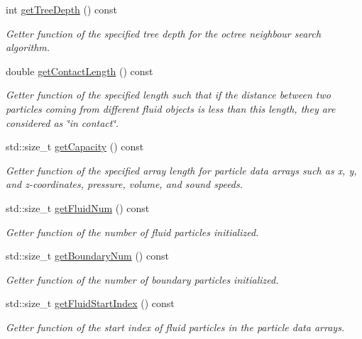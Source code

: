 \begin{DoxyCompactItemize}
int \hyperlink{classInitializer_ada300941810ded357d47b0f60c78eff9}{get\-Tree\-Depth} () const 
\begin{DoxyCompactList}\small\item\em Getter function of the specified tree depth for the octree neighbour search algorithm. \end{DoxyCompactList}\item 
double \hyperlink{classInitializer_a2ab802f1e315b413d2f9a7cf409e8330}{get\-Contact\-Length} () const 
\begin{DoxyCompactList}\small\item\em Getter function of the specified length such that if the distance between two particles coming from different fluid objects is less than this length, they are considered as \char`\"{}in contact\char`\"{}. \end{DoxyCompactList}\item 
std\-::size\-\_\-t \hyperlink{classInitializer_ab6879dbbdc2362c8d274a5b25ec2bb28}{get\-Capacity} () const 
\begin{DoxyCompactList}\small\item\em Getter function of the specified array length for particle data arrays such as x, y, and z-\/coordinates, pressure, volume, and sound speeds. \end{DoxyCompactList}\item 
std\-::size\-\_\-t \hyperlink{classInitializer_a5b13b014185a5a2b7cf8c0f8b23e07c0}{get\-Fluid\-Num} () const 
\begin{DoxyCompactList}\small\item\em Getter function of the number of {\itshape fluid} particles initialized. \end{DoxyCompactList}\item 
std\-::size\-\_\-t \hyperlink{classInitializer_a68bbcc759e78e4774d32b1cd3a71ef82}{get\-Boundary\-Num} () const 
\begin{DoxyCompactList}\small\item\em Getter function of the number of {\itshape boundary} particles initialized. \end{DoxyCompactList}\item 
std\-::size\-\_\-t \hyperlink{classInitializer_a96076c67424121f0b546571faa2bcba6}{get\-Fluid\-Start\-Index} () const 
\begin{DoxyCompactList}\small\item\em Getter function of the start index of fluid particles in the particle data arrays. \end{DoxyCompactList}\item 

\end{DoxyCompactItemize}
